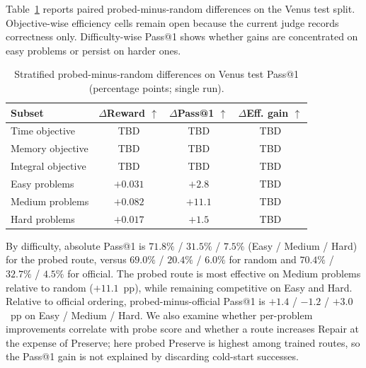 Table~\ref{tab:stratified-results} reports paired probed-minus-random
differences on the Venus test split. Objective-wise efficiency cells remain open
because the current judge records correctness only. Difficulty-wise Pass@1 shows
whether gains are concentrated on easy problems or persist on harder ones.

\begin{table}[t]
    \centering
    \caption{Stratified probed-minus-random differences on Venus test Pass@1
    (percentage points; single run).}
    \label{tab:stratified-results}
    \small
    \begin{tabular}{lccc}
        \hline
        Subset & $\Delta$Reward $\uparrow$ & $\Delta$Pass@1 $\uparrow$ & $\Delta$Eff. gain $\uparrow$ \\
        \hline
        Time objective & TBD & TBD & TBD \\
        Memory objective & TBD & TBD & TBD \\
        Integral objective & TBD & TBD & TBD \\
        Easy problems & $+0.031$ & $+2.8$ & TBD \\
        Medium problems & $+0.082$ & $+11.1$ & TBD \\
        Hard problems & $+0.017$ & $+1.5$ & TBD \\
        \hline
    \end{tabular}
\end{table}

By difficulty, absolute Pass@1 is $71.8\%$ / $31.5\%$ / $7.5\%$ (Easy / Medium /
Hard) for the probed route, versus $69.0\%$ / $20.4\%$ / $6.0\%$ for random and
$70.4\%$ / $32.7\%$ / $4.5\%$ for official. The probed route is most effective on
Medium problems relative to random ($+11.1$~pp), while remaining competitive on
Easy and Hard. Relative to official ordering, probed-minus-official Pass@1 is
$+1.4$ / $-1.2$ / $+3.0$~pp on Easy / Medium / Hard. We also examine whether
per-problem improvements correlate with probe score and whether a route increases
Repair at the expense of Preserve; here probed Preserve is highest among trained
routes, so the Pass@1 gain is not explained by discarding cold-start successes.
